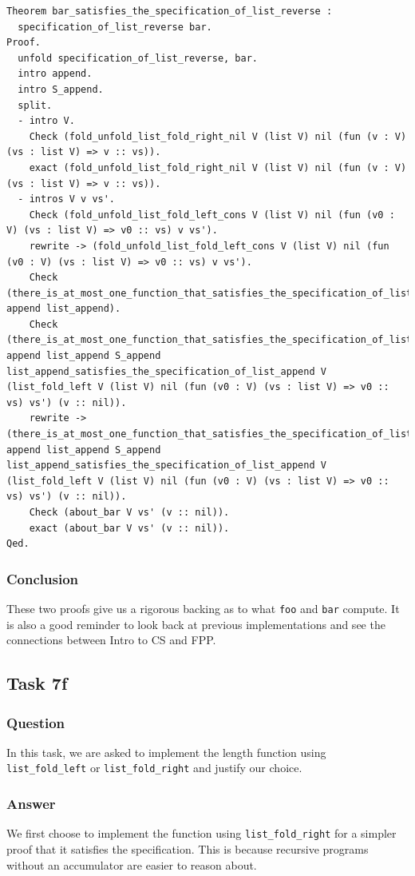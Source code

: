 \documentclass{article}
\begin{document}
\begin{lstlisting}
Theorem bar_satisfies_the_specification_of_list_reverse :
  specification_of_list_reverse bar.
Proof.
  unfold specification_of_list_reverse, bar.
  intro append.
  intro S_append.
  split.
  - intro V.
    Check (fold_unfold_list_fold_right_nil V (list V) nil (fun (v : V) (vs : list V) => v :: vs)).
    exact (fold_unfold_list_fold_right_nil V (list V) nil (fun (v : V) (vs : list V) => v :: vs)).
  - intros V v vs'.
    Check (fold_unfold_list_fold_left_cons V (list V) nil (fun (v0 : V) (vs : list V) => v0 :: vs) v vs').
    rewrite -> (fold_unfold_list_fold_left_cons V (list V) nil (fun (v0 : V) (vs : list V) => v0 :: vs) v vs').
    Check (there_is_at_most_one_function_that_satisfies_the_specification_of_list_append append list_append).
    Check (there_is_at_most_one_function_that_satisfies_the_specification_of_list_append append list_append S_append list_append_satisfies_the_specification_of_list_append V (list_fold_left V (list V) nil (fun (v0 : V) (vs : list V) => v0 :: vs) vs') (v :: nil)).
    rewrite -> (there_is_at_most_one_function_that_satisfies_the_specification_of_list_append append list_append S_append list_append_satisfies_the_specification_of_list_append V (list_fold_left V (list V) nil (fun (v0 : V) (vs : list V) => v0 :: vs) vs') (v :: nil)).
    Check (about_bar V vs' (v :: nil)).
    exact (about_bar V vs' (v :: nil)).
Qed.
\end{lstlisting}


\subsubsection{Conclusion}
These two proofs give us a rigorous backing as to what \texttt{foo} and \texttt{bar} compute. It is also a good reminder to look back at previous implementations and see the connections between Intro to CS and FPP.

\subsection{Task 7f}

\subsubsection{Question}
In this task, we are asked to implement the length function using \texttt{list\_fold\_left} or \texttt{list\_fold\_right} and justify our choice. 

\subsubsection{Answer}
We first choose to implement the function using \texttt{list\_fold\_right} for a simpler proof that it satisfies the specification. This is because recursive programs without an accumulator are easier to reason about. 
\end{document}
